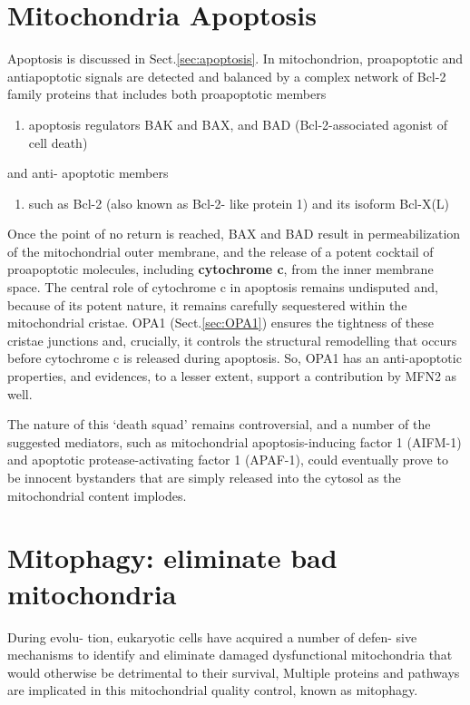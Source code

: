\section{Mitochondria Apoptosis}
\label{sec:apoptosis-mito}
\label{sec:cytochrome-C}

Apoptosis is discussed in Sect.\ref{sec:apoptosis}. In mitochondrion,
proapoptotic and antiapoptotic signals are detected and balanced by a complex
network of Bcl-2 family proteins that includes both proapoptotic members
\begin{enumerate}
  \item apoptosis regulators BAK and BAX, and BAD (Bcl-2-associated agonist of
cell death)
\end{enumerate}
and anti- apoptotic members 
\begin{enumerate}
  \item  such as Bcl-2 (also known as Bcl-2- like protein 1) and its isoform Bcl-X(L)

\end{enumerate}

Once the point of no return is reached, BAX and BAD result in permeabilization
of the mitochondrial outer membrane, and the release of a potent cocktail of
proapoptotic molecules, including {\bf cytochrome c}, from the inner membrane space.
The central role of cytochrome c in apoptosis remains undisputed and, because of
its potent nature, it remains carefully sequestered within the mitochondrial
cristae. OPA1 (Sect.\ref{sec:OPA1}) ensures the tightness of these cristae
junctions and, crucially, it controls the structural remodelling that occurs
before cytochrome c is released during apoptosis. So, OPA1 has an anti-apoptotic
properties, and evidences, to a lesser extent, support a contribution by MFN2 as well.

The nature of this ‘death squad’ remains controversial, and a number of the
suggested mediators, such as mitochondrial apoptosis-inducing factor 1 (AIFM-1)
and apoptotic protease-activating factor 1 (APAF-1), could eventually prove to
be innocent bystanders that are simply released into the cytosol as the
mitochondrial content implodes.

\section{Mitophagy: eliminate bad mitochondria}
\label{sec:mitophagy}

During evolu- tion, eukaryotic cells have acquired a number of defen- sive
mechanisms to identify and eliminate damaged dysfunctional mitochondria that
would otherwise be detrimental to their survival, Multiple proteins and pathways
are implicated in this mitochondrial quality control, known as mitophagy.

